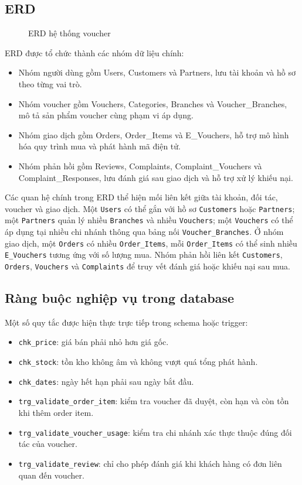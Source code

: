 \subsection{ERD}

\begin{figure}[H]
\centering
{}
\caption{ERD hệ thống voucher}
\end{figure}

ERD được tổ chức thành các nhóm dữ liệu chính:
\begin{itemize}[leftmargin=1.2cm]
    \item Nhóm người dùng gồm Users, Customers và Partners, lưu tài khoản và hồ sơ theo từng vai trò.
    \item Nhóm voucher gồm Vouchers, Categories, Branches và Voucher\_Branches, mô tả sản phẩm voucher cùng phạm vi áp dụng.
    \item Nhóm giao dịch gồm Orders, Order\_Items và E\_Vouchers, hỗ trợ mô hình hóa quy trình mua và phát hành mã điện tử.
    \item Nhóm phản hồi gồm Reviews, Complaints, Complaint\_Vouchers và Complaint\_Responses, lưu đánh giá sau giao dịch và hỗ trợ xử lý khiếu nại.
\end{itemize}

Các quan hệ chính trong ERD thể hiện mối liên kết giữa tài khoản, đối tác, voucher và giao dịch. Một \texttt{Users} có thể gắn với hồ sơ \texttt{Customers} hoặc \texttt{Partners}; một \texttt{Partners} quản lý nhiều \texttt{Branches} và nhiều \texttt{Vouchers}; một \texttt{Vouchers} có thể áp dụng tại nhiều chi nhánh thông qua bảng nối \texttt{Voucher\_Branches}. Ở nhóm giao dịch, một \texttt{Orders} có nhiều \texttt{Order\_Items}, mỗi \texttt{Order\_Items} có thể sinh nhiều \texttt{E\_Vouchers} tương ứng với số lượng mua. Nhóm phản hồi liên kết \texttt{Customers}, \texttt{Orders}, \texttt{Vouchers} và \texttt{Complaints} để truy vết đánh giá hoặc khiếu nại sau mua.

\subsection{Ràng buộc nghiệp vụ trong database}

Một số quy tắc được hiện thực trực tiếp trong schema hoặc trigger:

\begin{itemize}[leftmargin=1.2cm]
    \item \texttt{chk\_price}: giá bán phải nhỏ hơn giá gốc.
    \item \texttt{chk\_stock}: tồn kho không âm và không vượt quá tổng phát hành.
    \item \texttt{chk\_dates}: ngày hết hạn phải sau ngày bắt đầu.
    \item \texttt{trg\_validate\_order\_item}: kiểm tra voucher đã duyệt, còn hạn và còn tồn khi thêm order item.
    \item \texttt{trg\_validate\_voucher\_usage}: kiểm tra chi nhánh xác thực thuộc đúng đối tác của voucher.
    \item \texttt{trg\_validate\_review}: chỉ cho phép đánh giá khi khách hàng có đơn liên quan đến voucher.
\end{itemize}

